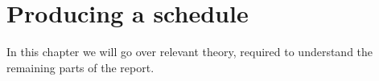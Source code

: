 \chapter{Producing a schedule} \label{cha:analysis}
In this chapter we will go over relevant theory, required to understand the remaining parts of the report.








